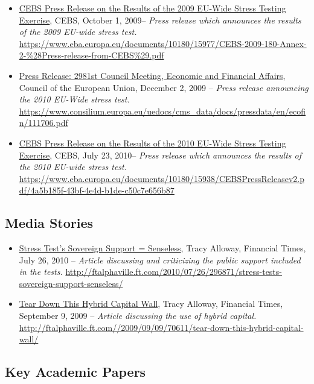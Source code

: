 \documentclass[12pt]{article}
\begin{document}
\begin{itemize}
\item
\ul{CEBS Press Release on the Results of the 2009 EU-Wide Stress Testing Exercise}, CEBS, October 1, 2009-- \emph{Press release which
  announces the results of the 2009 EU-wide stress test.} \url{https://www.eba.europa.eu/documents/10180/15977/CEBS-2009-180-Annex-2-\%28Press-release-from-CEBS\%29.pdf}
\item
\ul{Press Release: 2981st Council Meeting, Economic and Financial Affairs}, Council of the European Union, December 2, 2009 -- \emph{Press release
  announcing the 2010 EU-Wide stress test.} \url{https://www.consilium.europa.eu/uedocs/cms_data/docs/pressdata/en/ecofin/111706.pdf}
\item
\ul{CEBS Press Release on the Results of the 2010 EU-Wide Stress Testing Exercise}, CEBS, July 23, 2010-- \emph{Press release which
  announces the results of the 2010 EU-wide stress test.} \url{https://www.eba.europa.eu/documents/10180/15938/CEBSPressReleasev2.pdf/4a5b185f-43bf-4e4d-b1de-c50c7e656b87}
\end{itemize}

\subsection{Media Stories}

\begin{itemize}
\item
\ul{Stress Test's Sovereign Support = Senseless}, Tracy Alloway, Financial Times, July 26,
  2010 -- \emph{Article discussing and criticizing the public support included in the tests.} \url{http://ftalphaville.ft.com/2010/07/26/296871/stress-tests-sovereign-support-senseless/}
\item
\ul{Tear Down This Hybrid Capital Wall}, Tracy Alloway, Financial Times, September 9, 2009 -- \emph{Article discussing the use of hybrid capital.} \url{http://ftalphaville.ft.com//2009/09/09/70611/tear-down-this-hybrid-capital-wall/}

\end{itemize}

\subsection{Key Academic Papers}
\end{document}

